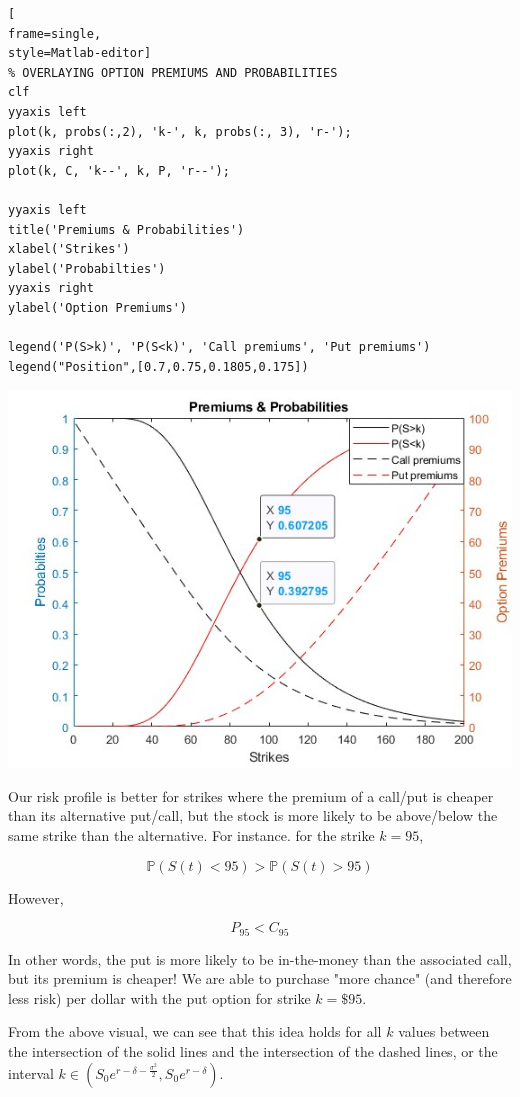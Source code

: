 \documentclass[letterpaper,12pt]{article}
\begin{document}
\begin{lstlisting}[
frame=single,
style=Matlab-editor]
% OVERLAYING OPTION PREMIUMS AND PROBABILITIES 
clf
yyaxis left
plot(k, probs(:,2), 'k-', k, probs(:, 3), 'r-');
yyaxis right
plot(k, C, 'k--', k, P, 'r--');

yyaxis left
title('Premiums & Probabilities')
xlabel('Strikes')
ylabel('Probabilties')
yyaxis right
ylabel('Option Premiums')

legend('P(S>k)', 'P(S<k)', 'Call premiums', 'Put premiums')
legend("Position",[0.7,0.75,0.1805,0.175])
\end{lstlisting}
\includegraphics[scale=0.8]{premiums_probabilities}
\pagebreak

Our risk profile is better for strikes where the premium of a call/put is 
cheaper than its alternative put/call, but the stock is more likely to be above/below 
the same strike than the alternative.  For instance. for the strike $k = 95$, 

$$\mathbb{P}(S(t) < 95)  >  \mathbb{P}(S(t) > 95)$$    

However,

$$P_{95} < C_{95}$$

In other words, the put is more likely to be in-the-money than the associated 
call, but its premium is cheaper!  We are able to purchase "more chance" (and 
therefore less risk) per dollar with the put option for strike $k = \$95$.

From the above visual, we can see that this idea holds for all $k$ values 
between the intersection of the solid lines and the intersection of the dashed 
lines, or the interval $k \in \left(S_0e^{r-\delta-\frac{\sigma^2}{2}}, S_0e^{r-\delta}\right)$.
\end{document}
